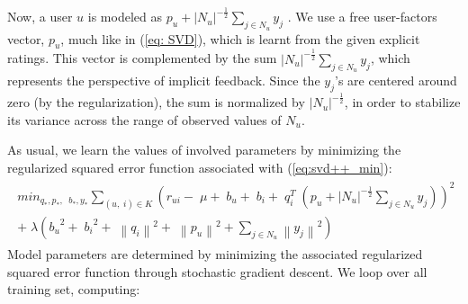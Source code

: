 \documentclass[oneside,13pt]{extreport}
\begin{document}
Now, a user $u$ is modeled as $p_u + {{\left| {{N_u}} \right|}^{ - \frac{1}{2}}}\sum\limits_{j \in  {N_u}} {{y_j}}$ . We use a free user-factors
vector, $p_u$, much like in (\ref{eq: SVD}), which is learnt from the given explicit ratings. This
vector is complemented by the sum ${{\left| {{N_u}} \right|}^{ - \frac{1}{2}}}\sum\limits_{j \in {N_u}} {{y_j}}$, which represents the perspective
of implicit feedback. Since the $y_j$’s are centered around zero (by the regularization),
the sum is normalized by ${{\left| {{N_u}} \right|}^{ - \frac{1}{2}}}$, in order to stabilize its variance
across the range of observed values of $N_u$.

As usual, we learn the values of involved parameters by minimizing the regularized squared error function associated with (\ref{eq:svd++_min}): 
\begin{eqnarray}
\label{eq:svd++_min}
\begin{aligned}
mi{n_{{q_*},{p_*},\;\;{b_*},{y_*}}}\mathop \sum \limits_{\left( {u,\;i} \right) \in K} {\left( {{r_{ui}} - \;\mu  + \;{b_u} + \;{b_i} + \;q_i^T\;\left( {{p_u} + {{\left| {{N_u}} \right|}^{ - \frac{1}{2}}}\sum\limits_{j  \in {N_u}} {{y_j}} } \right)} \right)^2} \\+ \;\lambda \left( {{b_u}^2 + \;{b_i}^2 + \;{{\left\| {{q_i}} \right\|}^2} + \;{{\left\| {{p_u}} \right\|}^2} + \sum\limits_{j \in {N_u}} {{{\left\| {{y_j}} \right\|}^2}} } \right)
\end{aligned}
\end{eqnarray}
Model parameters are determined by minimizing the associated regularized
squared error function through stochastic gradient descent. We loop over all training set, computing:
\end{document}
